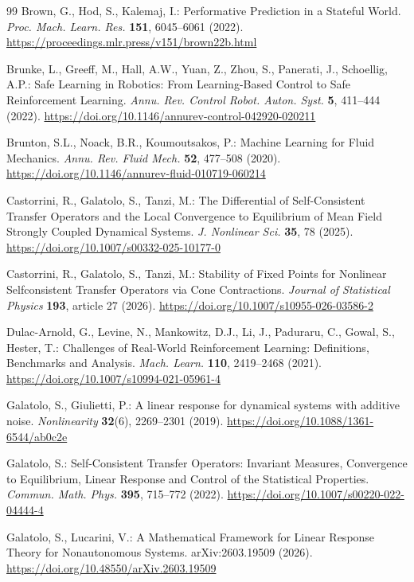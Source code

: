 \documentclass[11pt]{article}
\theoremstyle{definition}
\theoremstyle{remark}
\begin{document}
{\begin{thebibliography}{99}
Brown, G., Hod, S., Kalemaj, I.: Performative Prediction in a Stateful World. \emph{Proc. Mach. Learn. Res.} \textbf{151}, 6045--6061 (2022). \url{https://proceedings.mlr.press/v151/brown22b.html}

Brunke, L., Greeff, M., Hall, A.W., Yuan, Z., Zhou, S., Panerati, J., Schoellig, A.P.: Safe Learning in Robotics: From Learning-Based Control to Safe Reinforcement Learning. \emph{Annu. Rev. Control Robot. Auton. Syst.} \textbf{5}, 411--444 (2022). \url{https://doi.org/10.1146/annurev-control-042920-020211}

Brunton, S.L., Noack, B.R., Koumoutsakos, P.:
Machine Learning for Fluid Mechanics.
\emph{Annu. Rev. Fluid Mech.} \textbf{52}, 477--508 (2020).
\url{https://doi.org/10.1146/annurev-fluid-010719-060214}

Castorrini, R., Galatolo, S., Tanzi, M.: The Differential of Self-Consistent Transfer Operators and the Local Convergence to Equilibrium of Mean Field Strongly Coupled Dynamical Systems. \emph{J. Nonlinear Sci.} \textbf{35}, 78 (2025). \url{https://doi.org/10.1007/s00332-025-10177-0}

Castorrini, R., Galatolo, S., Tanzi, M.:
Stability of Fixed Points for Nonlinear Selfconsistent
Transfer Operators via Cone Contractions.
\emph{Journal of Statistical Physics}
\textbf{193}, article 27 (2026).
\url{https://doi.org/10.1007/s10955-026-03586-2}

Dulac-Arnold, G., Levine, N., Mankowitz, D.J., Li, J., Paduraru, C., Gowal, S., Hester, T.: Challenges of Real-World Reinforcement Learning: Definitions, Benchmarks and Analysis. \emph{Mach. Learn.} \textbf{110}, 2419--2468 (2021). \url{https://doi.org/10.1007/s10994-021-05961-4}

Galatolo, S., Giulietti, P.:
A linear response for dynamical systems with additive noise.
\emph{Nonlinearity}
\textbf{32}(6), 2269--2301 (2019).
\url{https://doi.org/10.1088/1361-6544/ab0c2e}

Galatolo, S.: Self-Consistent Transfer Operators: Invariant Measures, Convergence to Equilibrium, Linear Response and Control of the Statistical Properties. \emph{Commun. Math. Phys.} \textbf{395}, 715--772 (2022). \url{https://doi.org/10.1007/s00220-022-04444-4}

Galatolo, S., Lucarini, V.:
A Mathematical Framework for Linear Response Theory
for Nonautonomous Systems.
arXiv:2603.19509 (2026).
\url{https://doi.org/10.48550/arXiv.2603.19509}


\end{thebibliography}}
\end{document}
